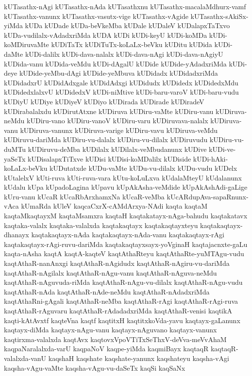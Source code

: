 {kUTasathx-nAgi
kUTasathx-nAda
kUTasathxnu
kUTasathx-macalaMdhurx-vamf
kUTasathx-vanunx
kUTasathx-vasutx-vige
kUTasathx-vAgide
kUTasathx-sAkiSx-yiMda
kUDa
kUDade
kUDa-beVkeMba
kUDale
kUDaleV
kUDalapxTaTxvo
kUDa-vudilalx-vAdadxriMda
kUDA
kUDi
kUDi-keyU
kUDi-koMDa
kUDi-koMDiruvaMte
kUDiTaTx
kUDiTuTx-koLaLx-beVku
kUDitu
kUDida
kUDi-daMte
kUDi-dalilx
kUDi-dava-nalalx
kUDi-dava-nAgi
kUDi-dava-nAgiyU
kUDida-vanu
kUDida-veMdu
kUDi-dAgalU
kUDide
kUDide-yAdadxriMda
kUDi-deye
kUDide-yeMbu-dAgi
kUDide-yeMbuva
kUDidadx
kUDidadxriMda
kUDidadxrU
kUDidAdxgale
kUDidAdxgi
kUDidudx
kUDidedx
kUDidedxMdu
kUDidedxlalxvU
kUDidedxV
kUDi-niMtive
kUDi-baru-varoV
kUDi-baru-vudu
kUDiyU
kUDiye
kUDiyeV
kUDiyo
kUDirada
kUDirade
kUDiradeV
kUDirabalalxdu
kUDirutAtxne
kUDiruva
kUDiru-vaMte
kUDiru-vanu
kUDiruva-neMdu
kUDiru-vano
kUDiru-vanoV
kUDiru-varu
kUDiruvava-nalalx
kUDiruva-vanu
kUDiruva-vanunx
kUDiruva-varige
kUDiru-vavu
kUDiruva-veMdu
kUDiruvu-dariMda
kUDiru-vu-dalalx
kUDiru-vu-dilalx
kUDiruvudu
kUDiru-vu-duMTu
kUDiruvu-deMba
kUDilalx
kUDilalx-veMbudanunx
kUDive
kUDi-ve-yaSeTx
kUDisalapxTiTxve
kUDisi
kUDisi-koMDalilx
kUDiside
kUDi-hAki-koLaLx-beVku
kUDutatxde
kUDu-vaMte
kUDu-vu-dilalx
kUDu-vudu
kUDelx
kUtalelxV
kUti-ruva
kUti-ruva-vara
kUtu-koLuLxva
kUdalaMteyU
kUdalanunx
kUdalu
kUpa
kUpadoLagina
kUpavu
kUpAkAsha-veMdide
kUpAkAshAdi-gaLige
kUru-vanu
kUcaR
kUcaRbArxhamxNa
kUcaR-veMba
kUcARdupAva-sapaRnunx-vAca
kUmaRda
kUleV
kaqcaCxrX-cAMdArxya-NAdi
kaqta
kaqtaM
kaqtaMkaqtayxM
kaqtaMsamxra
kaqtaH
kaqtakatayx-nAga-bahudu
kaqtakatavx
kaqtaka-valalx
kaqtaka-valalxda
kaqtakaqtayx
kaqtakaqtayxteyu
kaqtakaqtayx-dhanayx
kaqtakaqtayx-nAda
kaqtakaqtayx-nAda-vanu
kaqtakaqtayx-rAgi
kaqtakaqtayx-rAgi-ruvu-dariMda
kaqtakaqtayxsayx-yoVginaH
kaqtajacnxte-gaLu
kaqta-nAsha
kaqtA
kaqtA-kaqteV
kaqtAthaRteyu
kaqtAthaRte-yuMTAgu-vudu
kaqtAthaR-nanAnxgi
kaqtAthaR-nAgidudx
kaqtAthaR-nAgiru-vu-dariMda
kaqtAthaR-nAgilalx
kaqtAthaR-nAgu-vanu
kaqtAthaR-nAguva-neMdu
kaqtAthaR-nAguvuda-riMda
kaqtAthaR-nAgu-vu-dilalx
kaqtAthaR-nAgu-vudu
kaqtAthaR-nAda
kaqtAthaR-nAde-neMdu
kaqtAthaR-nAdadxriMda
kaqtAthaRni-gAgali
kaqtAthaR-neMba
kaqtAthaR-rAgi
kaqtAthaR-rAgi-ruva
kaqtAthaR-rAguvaru
kaqtAthaR-rAdadadxriMda
kaqtAthaR-venisi
kaqtikA
kaqti-kAtAvxtf
kaqteVna
kaqtf
kaqtitxH
kaqtitxkoVda-yavu
kaqtayx-gaLanunx
kaqtayx-diMda
kaqtayx-nAgu-vanu
kaqtayx-nAguvano
kaqtayx-vanunx
kaqtirxma-valalxda
kaqtAvx
kaqtovxVpoVTiTxSeThxV-deVva-meVvAhaM
kaqpaNaralalxda-varU
kaqpaNoV
kaqpe-yiMda
kaqmiBayx
kaqtaqR
kaqtaqR-valalxda-vanU
kaqshaH
kaqshate
kaqshate-yanunx
kaqshateyu
kaqsha-vAgi
kaqsha-vAgu-vaMte
kaqsha-vAgu-vu-daSeTx
kaqSi
kaqSaNx
}
